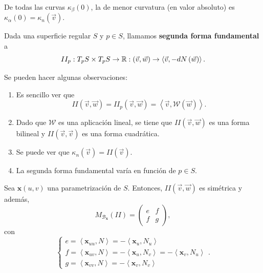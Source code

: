 \begin{colorary}
De todas las curvas $\displaystyle \kappa_{\beta }\left(0\right) $, la de menor curvatura (en valor absoluto) es $\displaystyle \kappa_{\alpha }\left(0\right)=\kappa_{n}\left(\vec{v}\right) $. 
\end{colorary}
\begin{definition}
Dada una superficie regular $\displaystyle S $ y $\displaystyle p \in S $, llamamos \textbf{segunda forma fundamental} a 
\[ II_{p} : T_{p}S \times T_{p}S \to \mathbb{R} : \left(\vec{v}, \vec{w}\right)\to \left\langle \vec{v}, -dN\left(\vec{w}\right) \right\rangle  .\]
\end{definition}
\begin{observation} Se pueden hacer algunas observaciones:
\begin{enumerate}
\item Es sencillo ver que 
	\[II\left(\vec{v}, \vec{w}\right)= II_{p}\left(\vec{v}, \vec{w}\right)=\left\langle \vec{v}, \mathcal{W}\left(\vec{w}\right) \right\rangle  .\]
\item Dado que $\displaystyle \mathcal{W} $ es una aplicación lineal, se tiene que $\displaystyle II\left(\vec{v}, \vec{w}\right) $ es una forma bilineal y $\displaystyle II\left(\vec{v}, \vec{v}\right) $ es una forma cuadrática.
\item Se puede ver que $\displaystyle \kappa_{n}\left(\vec{v}\right)=II\left(\vec{v}\right) $. 
\item La segunda forma fundamental varía en función de $\displaystyle p \in S $.
\end{enumerate}
\end{observation}
\begin{prop} Sea $\displaystyle \textbf{x} \left(u,v\right) $ una parametrización de $\displaystyle S $. Entonces, $\displaystyle II\left(\vec{v}, \vec{w}\right) $ es simétrica y además, 
\[M_{\mathcal{B}_{ \textbf{x} }}\left(II\right)=\begin{pmatrix} e & f \\ f & g \end{pmatrix} ,\]
con 
\[
\begin{cases}
e = \left\langle \textbf{x} _{uu}, N \right\rangle =-\left\langle \textbf{x} _{u}, N_{u} \right\rangle \\
f = \left\langle \textbf{x} _{uv}, N \right\rangle =-\left\langle \textbf{x} _{u}, N_{v} \right\rangle =-\left\langle \textbf{x} _{v}, N_{u} \right\rangle  \\
g = \left\langle \textbf{x} _{vv}, N \right\rangle =-\left\langle \textbf{x} _{v}, N_{v} \right\rangle 
\end{cases}
.\]
\end{prop}
